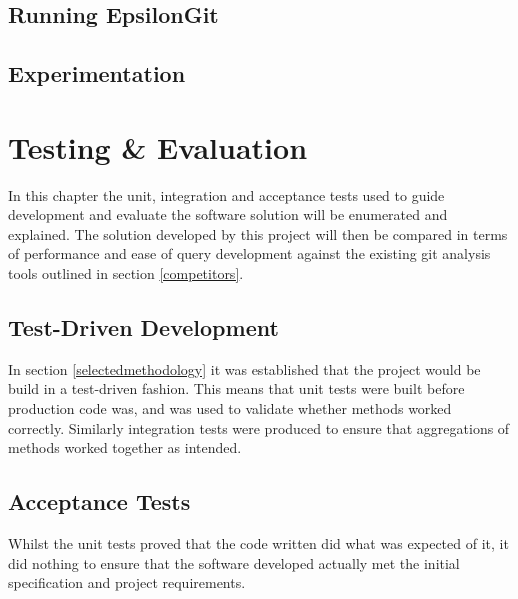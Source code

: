 \documentclass[11pt]{book}
\begin{document}
\section{Running EpsilonGit}

\section{Experimentation}


\chapter{Testing \& Evaluation}
\label{testeval}
In this chapter the unit, integration and acceptance tests used to guide development and evaluate the software solution will be enumerated and explained. The solution developed by this project will then be compared in terms of performance and ease of query development against the existing git analysis tools outlined in section \ref{competitors}.

\section{Test-Driven Development}
In section \ref{selectedmethodology} it was established that the project would be build in a test-driven fashion. This means that unit tests were built before production code was, and was used to validate whether methods worked correctly. Similarly integration tests were produced to ensure that aggregations of methods worked together as intended.

\section{Acceptance Tests}
Whilst the unit tests proved that the code written did what was expected of it, it did nothing to ensure that the software developed actually met the initial specification and project requirements. 
\end{document}
